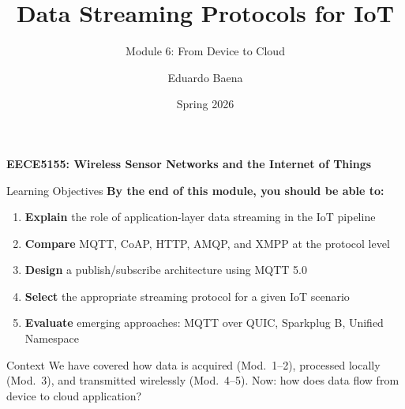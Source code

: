 \documentclass[aspectratio=169,11pt]{beamer}
\title[EECE5155 -- Module 6]{Data Streaming Protocols for IoT}
\subtitle{Module 6: From Device to Cloud}
\author{Eduardo Baena}
\date{Spring 2026}
\institute{Northeastern University\\Department of Electrical and Computer Engineering\\
\texttt{e.baena@northeastern.edu}}
\begin{document}
\begin{frame}
    \titlepage
    \vspace{-1cm}
    \begin{center}
        \textbf{EECE5155: Wireless Sensor Networks and the Internet of Things}
    \end{center}
\end{frame}

\begin{frame}{Learning Objectives}
    \textbf{By the end of this module, you should be able to:}
    
    \vspace{0.5cm}
    \begin{enumerate}
        \item \textbf{Explain} the role of application-layer data streaming in the IoT pipeline
        \item \textbf{Compare} MQTT, CoAP, HTTP, AMQP, and XMPP at the protocol level
        \item \textbf{Design} a publish/subscribe architecture using MQTT 5.0
        \item \textbf{Select} the appropriate streaming protocol for a given IoT scenario
        \item \textbf{Evaluate} emerging approaches: MQTT over QUIC, Sparkplug B, Unified Namespace
    \end{enumerate}
    
    \vspace{0.3cm}
    \begin{alertblock}{Context}
        We have covered how data is acquired (Mod.\ 1--2), processed locally (Mod.\ 3), and transmitted wirelessly (Mod.\ 4--5). Now: how does data flow from device to cloud application?
    \end{alertblock}
\end{frame}
\end{document}
